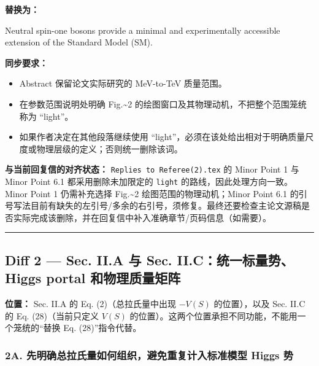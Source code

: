\documentclass[
]{article}
\newenvironment{Shaded}{}{}
\newcommand{\NormalTok}[1]{#1}
\providecommand{\tightlist}{%
  \setlength{\itemsep}{0pt}\setlength{\parskip}{0pt}}
\begin{document}
\textbf{替换为：}

\begin{Shaded}
\begin{Highlighting}[]
\NormalTok{Neutral spin{-}one bosons provide a minimal and experimentally accessible extension of the Standard Model (SM).}
\end{Highlighting}
\end{Shaded}

\textbf{同步要求：}

\begin{itemize}
\tightlist
\item
  Abstract 保留论文实际研究的 MeV-to-TeV 质量范围。
\item
  在参数范围说明处明确 Fig.\textasciitilde2
  的绘图窗口及其物理动机，不把整个范围笼统称为 ``light''。
\item
  如果作者决定在其他段落继续使用
  ``light''，必须在该处给出相对于明确质量尺度或物理层级的定义；否则统一删除该词。
\end{itemize}

\textbf{与当前回复信的对齐状态：} \texttt{Replies\ to\ Referee(2).\hspace{0pt}tex}
的 Minor Point 1 与 Minor Point 6.1 都采用删除未加限定的 \texttt{light}
的路线，因此处理方向一致。Minor Point 1 仍需补充选择
Fig.\textasciitilde2 绘图范围的物理动机；Minor Point 6.1
的引号写法目前有缺失的左引号/多余的右引号，须修复。最终还要检查主论文源稿是否实际完成该删除，并在回复信中补入准确章节/页码信息（如需要）。

\begin{center}\rule{0.5\linewidth}{0.5pt}\end{center}

\subsection{Diff 2 --- Sec. II.A 与 Sec. II.C：统一标量势、Higgs portal
和物理质量矩阵}\label{diff-2-sec.-ii.a-ux4e0e-sec.-ii.cux7edfux4e00ux6807ux91cfux52bfhiggs-portal-ux548cux7269ux7406ux8d28ux91cfux77e9ux9635}

\textbf{位置：} Sec. II.A 的 Eq. (2)（总拉氏量中出现 \(-V(S)\)
的位置），以及 Sec. II.C 的 Eq. (28)（当前只定义 \(V(S)\)
的位置）。这两个位置承担不同功能，不能用一个笼统的``替换 Eq.
(28)''指令代替。

\subsubsection{2A. 先明确总拉氏量如何组织，避免重复计入标准模型 Higgs
势}\label{a.-ux5148ux660eux786eux603bux62c9ux6c0fux91cfux5982ux4f55ux7ec4ux7ec7ux907fux514dux91cdux590dux8ba1ux5165ux6807ux51c6ux6a21ux578b-higgs-ux52bf}
\end{document}

